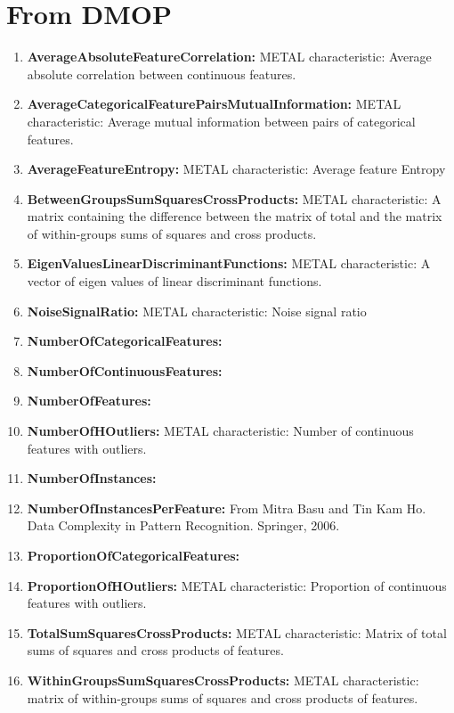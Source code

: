 \documentclass[a4paper,12pt, english]{article}
\begin{document}
\section{From DMOP}
\begin{enumerate}
		\item \textbf{AverageAbsoluteFeatureCorrelation:} METAL characteristic: Average absolute correlation between continuous features.
		\item \textbf{AverageCategoricalFeaturePairsMutualInformation:}  METAL characteristic: Average mutual information between pairs of categorical features. 
		\item \textbf{AverageFeatureEntropy:} METAL characteristic: Average feature Entropy
		\item \textbf{BetweenGroupsSumSquaresCrossProducts:} METAL characteristic: A matrix containing the difference between the matrix of total and the matrix of within-groups sums of squares and cross products.
		\item \textbf{EigenValuesLinearDiscriminantFunctions:} METAL characteristic: A vector of eigen values of linear discriminant functions.
		\item \textbf{NoiseSignalRatio:}  METAL characteristic: Noise signal ratio
		\item \textbf{NumberOfCategoricalFeatures:}
		\item \textbf{NumberOfContinuousFeatures:}
		\item \textbf{NumberOfFeatures:}
		\item \textbf{NumberOfHOutliers:} METAL characteristic: Number of continuous features with outliers.
		\item \textbf{NumberOfInstances:}
		\item \textbf{NumberOfInstancesPerFeature:} From Mitra Basu and Tin Kam Ho. Data Complexity in Pattern Recognition. Springer, 2006. 
		\item \textbf{ProportionOfCategoricalFeatures:}
		\item \textbf{ProportionOfHOutliers:} METAL characteristic: Proportion of continuous features with outliers.
		\item \textbf{TotalSumSquaresCrossProducts:} METAL characteristic: Matrix of total sums of squares and cross products of features.
		\item \textbf{WithinGroupsSumSquaresCrossProducts:} METAL characteristic: matrix of within-groups sums of squares and cross products of features. 
\end{enumerate}    		
		
\end{document}
